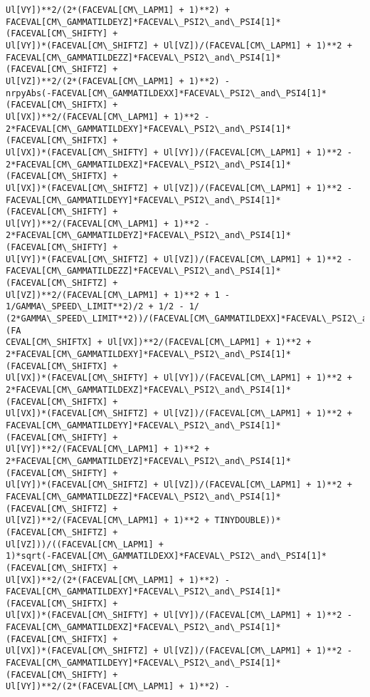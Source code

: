 \documentclass[landscape,letterpaper,10pt,english]{article}
\begin{document}
\begin{Verbatim}[commandchars=\\\{\}]
Ul[VY])**2/(2*(FACEVAL[CM\_LAPM1] + 1)**2) +
FACEVAL[CM\_GAMMATILDEYZ]*FACEVAL\_PSI2\_and\_PSI4[1]*(FACEVAL[CM\_SHIFTY] +
Ul[VY])*(FACEVAL[CM\_SHIFTZ] + Ul[VZ])/(FACEVAL[CM\_LAPM1] + 1)**2 +
FACEVAL[CM\_GAMMATILDEZZ]*FACEVAL\_PSI2\_and\_PSI4[1]*(FACEVAL[CM\_SHIFTZ] +
Ul[VZ])**2/(2*(FACEVAL[CM\_LAPM1] + 1)**2) -
nrpyAbs(-FACEVAL[CM\_GAMMATILDEXX]*FACEVAL\_PSI2\_and\_PSI4[1]*(FACEVAL[CM\_SHIFTX] +
Ul[VX])**2/(FACEVAL[CM\_LAPM1] + 1)**2 -
2*FACEVAL[CM\_GAMMATILDEXY]*FACEVAL\_PSI2\_and\_PSI4[1]*(FACEVAL[CM\_SHIFTX] +
Ul[VX])*(FACEVAL[CM\_SHIFTY] + Ul[VY])/(FACEVAL[CM\_LAPM1] + 1)**2 -
2*FACEVAL[CM\_GAMMATILDEXZ]*FACEVAL\_PSI2\_and\_PSI4[1]*(FACEVAL[CM\_SHIFTX] +
Ul[VX])*(FACEVAL[CM\_SHIFTZ] + Ul[VZ])/(FACEVAL[CM\_LAPM1] + 1)**2 -
FACEVAL[CM\_GAMMATILDEYY]*FACEVAL\_PSI2\_and\_PSI4[1]*(FACEVAL[CM\_SHIFTY] +
Ul[VY])**2/(FACEVAL[CM\_LAPM1] + 1)**2 -
2*FACEVAL[CM\_GAMMATILDEYZ]*FACEVAL\_PSI2\_and\_PSI4[1]*(FACEVAL[CM\_SHIFTY] +
Ul[VY])*(FACEVAL[CM\_SHIFTZ] + Ul[VZ])/(FACEVAL[CM\_LAPM1] + 1)**2 -
FACEVAL[CM\_GAMMATILDEZZ]*FACEVAL\_PSI2\_and\_PSI4[1]*(FACEVAL[CM\_SHIFTZ] +
Ul[VZ])**2/(FACEVAL[CM\_LAPM1] + 1)**2 + 1 - 1/GAMMA\_SPEED\_LIMIT**2)/2 + 1/2 - 1/
(2*GAMMA\_SPEED\_LIMIT**2))/(FACEVAL[CM\_GAMMATILDEXX]*FACEVAL\_PSI2\_and\_PSI4[1]*(FA
CEVAL[CM\_SHIFTX] + Ul[VX])**2/(FACEVAL[CM\_LAPM1] + 1)**2 +
2*FACEVAL[CM\_GAMMATILDEXY]*FACEVAL\_PSI2\_and\_PSI4[1]*(FACEVAL[CM\_SHIFTX] +
Ul[VX])*(FACEVAL[CM\_SHIFTY] + Ul[VY])/(FACEVAL[CM\_LAPM1] + 1)**2 +
2*FACEVAL[CM\_GAMMATILDEXZ]*FACEVAL\_PSI2\_and\_PSI4[1]*(FACEVAL[CM\_SHIFTX] +
Ul[VX])*(FACEVAL[CM\_SHIFTZ] + Ul[VZ])/(FACEVAL[CM\_LAPM1] + 1)**2 +
FACEVAL[CM\_GAMMATILDEYY]*FACEVAL\_PSI2\_and\_PSI4[1]*(FACEVAL[CM\_SHIFTY] +
Ul[VY])**2/(FACEVAL[CM\_LAPM1] + 1)**2 +
2*FACEVAL[CM\_GAMMATILDEYZ]*FACEVAL\_PSI2\_and\_PSI4[1]*(FACEVAL[CM\_SHIFTY] +
Ul[VY])*(FACEVAL[CM\_SHIFTZ] + Ul[VZ])/(FACEVAL[CM\_LAPM1] + 1)**2 +
FACEVAL[CM\_GAMMATILDEZZ]*FACEVAL\_PSI2\_and\_PSI4[1]*(FACEVAL[CM\_SHIFTZ] +
Ul[VZ])**2/(FACEVAL[CM\_LAPM1] + 1)**2 + TINYDOUBLE))*(FACEVAL[CM\_SHIFTZ] +
Ul[VZ]))/((FACEVAL[CM\_LAPM1] +
1)*sqrt(-FACEVAL[CM\_GAMMATILDEXX]*FACEVAL\_PSI2\_and\_PSI4[1]*(FACEVAL[CM\_SHIFTX] +
Ul[VX])**2/(2*(FACEVAL[CM\_LAPM1] + 1)**2) -
FACEVAL[CM\_GAMMATILDEXY]*FACEVAL\_PSI2\_and\_PSI4[1]*(FACEVAL[CM\_SHIFTX] +
Ul[VX])*(FACEVAL[CM\_SHIFTY] + Ul[VY])/(FACEVAL[CM\_LAPM1] + 1)**2 -
FACEVAL[CM\_GAMMATILDEXZ]*FACEVAL\_PSI2\_and\_PSI4[1]*(FACEVAL[CM\_SHIFTX] +
Ul[VX])*(FACEVAL[CM\_SHIFTZ] + Ul[VZ])/(FACEVAL[CM\_LAPM1] + 1)**2 -
FACEVAL[CM\_GAMMATILDEYY]*FACEVAL\_PSI2\_and\_PSI4[1]*(FACEVAL[CM\_SHIFTY] +
Ul[VY])**2/(2*(FACEVAL[CM\_LAPM1] + 1)**2) -

\end{Verbatim}
\end{document}
